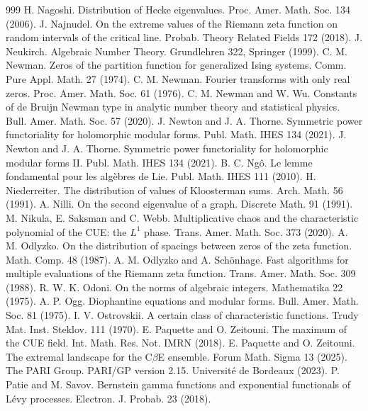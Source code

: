 \begin{thebibliography}{999}
 H. Nagoshi. Distribution of Hecke eigenvalues. Proc. Amer. Math. Soc. 134 (2006).
 J. Najnudel. On the extreme values of the Riemann zeta function on random intervals of the critical line. Probab. Theory Related Fields 172 (2018).
 J. Neukirch. Algebraic Number Theory. Grundlehren 322, Springer (1999).
 C. M. Newman. Zeros of the partition function for generalized Ising systems. Comm. Pure Appl. Math. 27 (1974).
 C. M. Newman. Fourier transforms with only real zeros. Proc. Amer. Math. Soc. 61 (1976).
 C. M. Newman and W. Wu. Constants of de Bruijn Newman type in analytic number theory and statistical physics. Bull. Amer. Math. Soc. 57 (2020).
 J. Newton and J. A. Thorne. Symmetric power functoriality for holomorphic modular forms. Publ. Math. IHES 134 (2021).
 J. Newton and J. A. Thorne. Symmetric power functoriality for holomorphic modular forms II. Publ. Math. IHES 134 (2021).
 B. C. Ng\^o. Le lemme fondamental pour les alg\`ebres de Lie. Publ. Math. IHES 111 (2010).
 H. Niederreiter. The distribution of values of Kloosterman sums. Arch. Math. 56 (1991).
 A. Nilli. On the second eigenvalue of a graph. Discrete Math. 91 (1991).
 M. Nikula, E. Saksman and C. Webb. Multiplicative chaos and the characteristic polynomial of the CUE: the $L^1$ phase. Trans. Amer. Math. Soc. 373 (2020).
 A. M. Odlyzko. On the distribution of spacings between zeros of the zeta function. Math. Comp. 48 (1987).
 A. M. Odlyzko and A. Sch\"onhage. Fast algorithms for multiple evaluations of the Riemann zeta function. Trans. Amer. Math. Soc. 309 (1988).
 R. W. K. Odoni. On the norms of algebraic integers. Mathematika 22 (1975).
 A. P. Ogg. Diophantine equations and modular forms. Bull. Amer. Math. Soc. 81 (1975).
 I. V. Ostrovskii. A certain class of characteristic functions. Trudy Mat. Inst. Steklov. 111 (1970).
 E. Paquette and O. Zeitouni. The maximum of the CUE field. Int. Math. Res. Not. IMRN (2018).
 E. Paquette and O. Zeitouni. The extremal landscape for the C$\beta$E ensemble. Forum Math. Sigma 13 (2025).
 The PARI Group. PARI/GP version 2.15. Universit\'e de Bordeaux (2023).
 P. Patie and M. Savov. Bernstein gamma functions and exponential functionals of L\'evy processes. Electron. J. Probab. 23 (2018).

\end{thebibliography}
